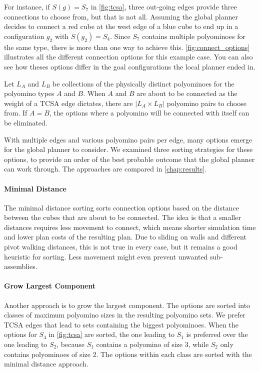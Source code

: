 For instance, if $S(g) = S_7$ in \autoref{fig:tcsa}, three out-going edges provide three connections to choose from, but that is not all.
Assuming the global planner decides to connect a red cube at the west edge of a blue cube to end up in a configuration $g_2$ with $S(g_2) = S_4$.
Since $S_7$ contains multiple polyominoes for the same type, there is more than one way to achieve this.
\autoref{fig:connect_options} illustrates all the different connection options for this example case.
You can also see how theses options differ in the goal configurations the local planner ended in.

Let $L_A$ and $L_B$ be collections of the physically distinct polyominoes for the polyomino types $A$ and $B$.
When $A$ and $B$ are about to be connected as the weight of a TCSA edge dictates, there are $\left| L_A \times L_B \right|$ polyomino pairs to choose from.
If $A = B$, the options where a polyomino will be connected with itself can be eliminated.

With multiple edges and various polyomino pairs per edge, many options emerge for the global planner to consider.
We examined three sorting strategies for these options, to provide an order of the best probable outcome that the global planner can work through. 
The approaches are compared in \autoref{chap:results}.

\paragraph{Minimal Distance}

The minimal distance sorting sorts connection options based on the distance between the cubes that are about to be connected.
The idea is that a smaller distances requires less movement to connect, which means shorter simulation time and lower plan costs of the resulting plan.
Due to sliding on walls and different pivot walking distances, this is not true in every case, but it remains a good heuristic for sorting.
Less movement might even prevent unwanted sub-assemblies.

\paragraph{Grow Largest Component}

Another approach is to grow the largest component.
The options are sorted into classes of maximum polyomino sizes in the resulting polyomino sets.
We prefer TCSA edges that lead to sets containing the biggest polyominoes.
When the options for $S_4$ in \autoref{fig:tcsa} are sorted, the one leading to $S_1$ is preferred over the one leading to $S_2$, because $S_1$ contains a polyomino of size $3$, while $S_2$ only contains polyominoes of size $2$. 
The options within each class are sorted with the minimal distance approach.

